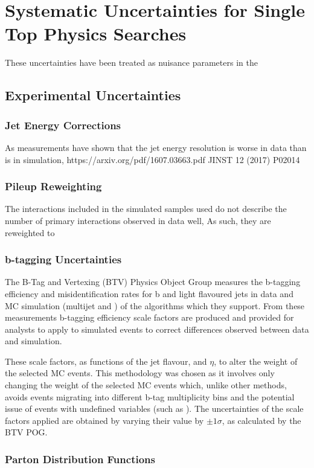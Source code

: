 \chapter{Systematic Uncertainties for Single Top Physics Searches}\label{chapter:tzq-systematics}

These uncertainties have been treated as nuisance parameters in the 
\section{Experimental Uncertainties}
\subsection{Jet Energy Corrections}
As measurements have shown that the jet energy resolution is worse in data than is in simulation, 
https://arxiv.org/pdf/1607.03663.pdf
JINST 12 (2017) P02014
\subsection{Pileup Reweighting}
The \PU interactions included in the simulated samples used do not describe the number of primary interactions observed in data well, 
As such, they are reweighted to 

\subsection{b-tagging Uncertainties}
The B-Tag and Vertexing (BTV) Physics Object Group measures the b-tagging efficiency and misidentification rates for b and light flavoured jets in data and MC simulation (multijet and \ttbar) of the algorithms which they support.
From these measurements b-tagging efficiency scale factors are produced and provided for analysts to apply to simulated events to correct differences observed between data and simulation.

These scale factors, as functions of the jet flavour, \pT and $\eta$, to alter the weight of the selected MC events.
This methodology was chosen as it involves only changing the weight of the selected MC events which, unlike other methods, avoids events migrating into different b-tag multiplicity bins and the potential issue of events with undefined variables (such as ).
The uncertainties of the scale factors applied are obtained by varying their value by $\pm 1\sigma$, as calculated by the BTV POG. 

\subsection{Parton Distribution Functions}
